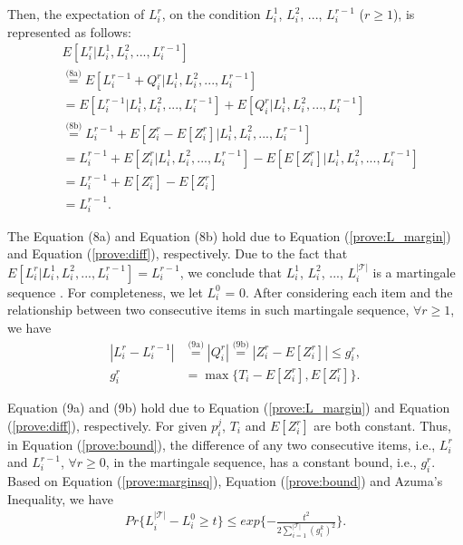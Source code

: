 \documentclass[conference]{IEEEtran}
\begin{document}
Then, the expectation of $L_i^{r}$, on the condition $L_i^{1}$, $L_i^{2}$, ..., $L_i^{r-1}$ ($r \geq 1$), is represented as follows:
\vspace{-0.1cm}
\begin{align}
&E[L_i^{r}|L_i^{1}, L_i^{2}, ..., L_i^{r-1}] \nonumber\\
&\overset{\text{(8a)}}{=}E[L_i^{r-1} + Q_i^{r} |L_i^{1}, L_i^{2}, ..., L_i^{r-1}] \nonumber\\
&\overset{\text{}}{=}E[L_i^{r-1} |L_i^{1}, L_i^{2}, ..., L_i^{r-1}]
+ E[Q_i^{r} |L_i^{1}, L_i^{2}, ..., L_i^{r-1}] \nonumber\\
&\overset{\text{(8b)}}{=}L_i^{r-1} + E[Z_i^r - E[Z_i^r] |L_i^{1}, L_i^{2}, ..., L_i^{r-1}]\nonumber\\
&=L_i^{r-1} + E[Z_i^r|L_i^{1}, L_i^{2}, ..., L_i^{r-1}]
-E[E[Z_i^r] |L_i^{1}, L_i^{2}, ..., L_i^{r-1}]\nonumber\\
&=L_i^{r-1} + E[Z_i^r] - E[Z_i^r]\nonumber\\
&=L_i^{r-1}.\label{prove:marginsq}
\end{align}

\vspace{-0.2cm}
The Equation (8a) and Equation (8b) hold due to Equation (\ref{prove:L_margin}) and Equation (\ref{prove:diff}), respectively. Due to the fact that $E[L_i^{r}|L_i^{1}, L_i^{2}, ..., L_i^{r-1}] = L_i^{r-1}$, we conclude that $L_i^{1}$, $L_i^{2}$, ..., $L_i^{|\mathcal{T}|}$ is a martingale sequence \cite{b13}. For completeness, we let $L_i^{0}$ = 0. After considering each item and the relationship between two consecutive items in such martingale sequence, $\forall r \geq 1$, we have
\vspace{-0.2cm}
\begin{align}
  |L_i^r - L_i^{r-1}|&\overset{\text{(9a)}}{=} |Q_i^{r}| \overset{\text{(9b)}}{=} |Z_i^r - E[Z_i^r]|\leq g_i^r, \label{prove:bound1}\\
  g_i^r &= \max\{T_i -  E[Z_i^r], E[Z_i^r]\}.\label{prove:bound}
\end{align}

\vspace{-0.15cm}
Equation (9a) and (9b) hold due to Equation (\ref{prove:L_margin}) and Equation (\ref{prove:diff}), respectively. For given $p_i^j$, $T_i$ and $E[Z_i^r]$ are both constant. Thus, in Equation (\ref{prove:bound}), the difference of any two consecutive items, i.e., $L_i^r$ and $L_i^{r-1}$, $\forall r \geq 0$, in the martingale sequence, has a constant bound, i.e., $g_i^r$. Based on Equation (\ref{prove:marginsq}), Equation (\ref{prove:bound}) and Azuma's Inequality, we have
\vspace{-0.3cm}
\begin{align}
Pr\{L_i^{|\mathcal{T}|} - L_i^{0} \geq t\} \leq exp\{-\frac{t^2}{2\sum_{ i = 1 }^{|\mathcal{T}|}(g_i^k)^2}\}. \label{prove:azuma}
\end{align}
\end{document}
